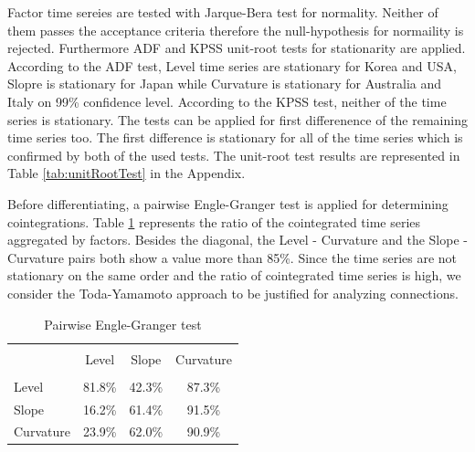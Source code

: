 \documentclass[12pt,bibliography=totoc]{article}
\begin{document}
Factor time sereies are tested with Jarque-Bera test for normality. Neither of them passes the acceptance criteria therefore the null-hypothesis for normaility is rejected. Furthermore ADF and KPSS unit-root tests for stationarity are applied. According to the ADF test, Level time series are stationary for Korea and USA, Slopre is stationary for Japan while Curvature is stationary for Australia and Italy on 99\% confidence level. According to the KPSS test, neither of the time series is stationary. The tests can be applied for first differenence of the remaining time series too. The first difference is stationary for all of the time series which is confirmed by both of the used tests. The unit-root test results are represented in Table \ref{tab:unitRootTest} in the Appendix.

Before differentiating, a pairwise Engle-Granger test is applied for determining cointegrations. Table \ref{tab:pairwiseEngleGranger} represents the ratio of the cointegrated time series aggregated by factors. Besides the diagonal, the Level - Curvature and the Slope - Curvature pairs both show a value more than 85\%. Since the time series are not stationary on the same order and the ratio of cointegrated time series is high, we consider the Toda-Yamamoto approach to be justified for analyzing connections.

\begin{table}[H]


\centering%
\begin{tabular}{l  ccc}%
\hline\hline \\ [-1.5ex]                         %

	&	Level 	&	Slope	&	Curvature	\\
\hline \\ [-1.5ex]  
Level 		&81.8\%		&42.3\%	&87.3\% \\
Slope 		&16.2\%		&61.4\%	&91.5\% \\
Curvature 	&23.9\%		&62.0\%	&90.9\% \\



\hline            

\end{tabular}
\caption{Pairwise Engle-Granger test} %
\label{tab:pairwiseEngleGranger}%
\end{table}
\end{document}
